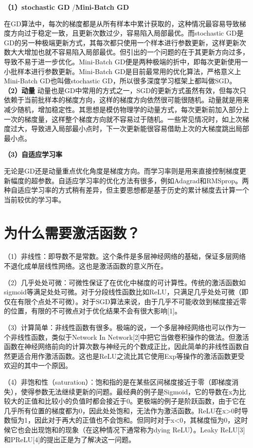 \textbf{（1）stochastic GD} /\textbf{Mini-Batch GD}

​
在GD算法中，每次的梯度都是从所有样本中累计获取的，这种情况最容易导致梯度方向过于稳定一致，且更新次数过少，容易陷入局部最优。而stochastic
GD是GD的另一种极端更新方式，其每次都只使用一个样本进行参数更新，这样更新次数大大增加也就不容易陷入局部最优。但引出的一个问题的在于其更新方向过多，导致不易于进一步优化。Mini-Batch
GD便是两种极端的折中，即每次更新使用一小批样本进行参数更新。Mini-Batch
GD是目前最常用的优化算法，严格意义上Mini-Batch GD也叫做stochastic
GD，所以很多深度学习框架上都叫做SGD。 \textbf{（2）动量 } ​
动量也是GD中常用的方式之一，SGD的更新方式虽然有效，但每次只依赖于当前批样本的梯度方向，这样的梯度方向依然很可能很随机。动量就是用来减少随机，增加稳定性。其思想是模仿物理学的动量方式，每次更新前加入部分上一次的梯度量，这样整个梯度方向就不容易过于随机。一些常见情况时，如上次梯度过大，导致进入局部最小点时，下一次更新能很容易借助上次的大梯度跳出局部最小点。

\textbf{（3）自适应学习率 }

​
无论是GD还是动量重点优化角度是梯度方向。而学习率则是用来直接控制梯度更新幅度的超参数。自适应学习率的优化方法有很多，例如Adagrad和RMSprop。两种自适应学习率的方式稍有差异，但主要思想都是基于历史的累计梯度去计算一个当前较优的学习率。

\section{为什么需要激活函数？}\label{ux4e3aux4ec0ux4e48ux9700ux8981ux6fc0ux6d3bux51fdux6570}

（1）非线性：即导数不是常数。这个条件是多层神经网络的基础，保证多层网络不退化成单层线性网络。这也是激活函数的意义所在。

（2）几乎处处可微：可微性保证了在优化中梯度的可计算性。传统的激活函数如sigmoid等满足处处可微。对于分段线性函数比如ReLU，只满足几乎处处可微（即仅在有限个点处不可微）。对于SGD算法来说，由于几乎不可能收敛到梯度接近零的位置，有限的不可微点对于优化结果不会有很大影响{[}1{]}。

（3）计算简单：非线性函数有很多。极端的说，一个多层神经网络也可以作为一个非线性函数，类似于Network
In
Network{[}2{]}中把它当做卷积操作的做法。但激活函数在神经网络前向的计算次数与神经元的个数成正比，因此简单的非线性函数自然更适合用作激活函数。这也是ReLU之流比其它使用Exp等操作的激活函数更受欢迎的其中一个原因。

（4）非饱和性（saturation）：饱和指的是在某些区间梯度接近于零（即梯度消失），使得参数无法继续更新的问题。最经典的例子是Sigmoid，它的导数在x为比较大的正值和比较小的负值时都会接近于0。更极端的例子是阶跃函数，由于它在几乎所有位置的梯度都为0，因此处处饱和，无法作为激活函数。ReLU在x\textgreater{}0时导数恒为1，因此对于再大的正值也不会饱和。但同时对于x\textless{}0，其梯度恒为0，这时候它也会出现饱和的现象（在这种情况下通常称为dying
ReLU）。Leaky ReLU{[}3{]}和PReLU{[}4{]}的提出正是为了解决这一问题。

